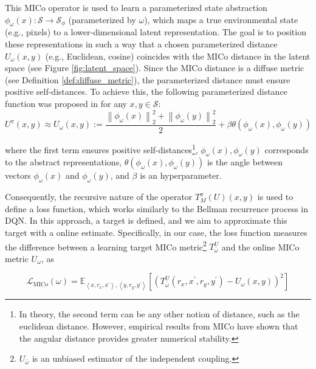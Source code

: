 
This MICo operator is used to learn a parameterized state abstraction \(\phi_\omega(x) : \mathcal{S} \to \mathcal{S}_\phi\) (parameterized by \(\omega\)), which maps a true environmental state (e.g., pixels) to a lower-dimensional latent representation. The goal is to position these representations in such a way that a chosen parameterized distance $U_\omega(x,y)$ (e.g., Euclidean, cosine) coincides with the MICo distance in the latent space (see Figure \ref{fig:latent_space}). Since the MICo distance is a diffuse metric (see Definition \ref{def:diffuse_metric}), the parameterized distance must ensure positive self-distances. To achieve this, the following parameterized distance function was proposed in \cite{castro2021mico} for any \(x, y \in \mathcal{S}\):
\begin{equation}
    U^\pi(x, y) \approx U_\omega(x, y):=\frac{\left\|\phi_\omega(x)\right\|_2^2+\left\|\phi_\omega(y)\right\|_2^2}{2}+\beta \theta\left(\phi_\omega(x), \phi_\omega(y)\right)
\end{equation}

where the first term ensures positive self-distances\footnote{In theory, the second term can be any other notion of distance, such as the euclidean distance. However, empirical results from MICo\cite{castro2021mico} have shown that the angular distance provides greater numerical stability.}, $\phi_\omega(x), \phi_\omega(y)$ corresponds to the abstract representations, $\theta\left(\phi_\omega(x), \phi_\omega(y)\right)$ is the angle between vectors $\phi_\omega(x)$ and $\phi_\omega(y)$, and $\beta$ is an hyperparameter.

Consequently, the recursive nature of the operator \(T_M^\pi(U)(x,y)\) is used to define a loss function, which works similarly to the Bellman recurrence process in DQN. In this approach, a target is defined, and we aim to approximate this target with a online estimate. Specifically, in our case, the loss function measures the difference between a learning target MICo metric\footnote{\(U_{\bar{\omega}}\) is an unbiased estimator of the independent coupling.} \(T_{\bar{\omega}}^U\) and the online MICo metric \(U_\omega\), as 

\begin{equation}
\label{eq:mico_loss}
    \mathcal{L}_{\mathrm{MICo}}(\omega)=\mathbb{E}_{\left\langle x, r_x, x^{\prime}\right\rangle,\left\langle y, r_y, y^{\prime}\right\rangle}\left[\left(T_{\bar{\omega}}^U\left(r_x, x^{\prime}, r_y, y^{\prime}\right)-U_\omega(x, y)\right)^2\right]
\end{equation}

